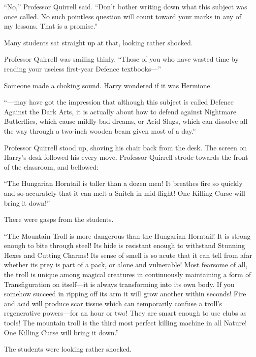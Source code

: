 “No,” Professor Quirrell said. “Don’t bother writing down what this subject was once called. No such pointless question will count toward your marks in any of my lessons. That is a promise.”

Many students sat straight up at that, looking rather shocked.

Professor Quirrell was smiling thinly. “Those of you who have wasted time by reading your useless first-year Defence textbooks—”

Someone made a choking sound. Harry wondered if it was Hermione.

“—may have got the impression that although this subject is called Defence Against the Dark Arts, it is actually about how to defend against Nightmare Butterflies, which cause mildly bad dreams, or Acid Slugs, which can dissolve all the way through a two-inch wooden beam given most of a day.”

Professor Quirrell stood up, shoving his chair back from the desk. The screen on Harry’s desk followed his every move. Professor Quirrell strode towards the front of the classroom, and bellowed:

“The Hungarian Horntail is taller than a dozen men! It breathes fire so quickly and so accurately that it can melt a Snitch in mid-flight! One Killing Curse will bring it down!”

There were gasps from the students.

“The Mountain Troll is more dangerous than the Hungarian Horntail! It is strong enough to bite through steel! Its hide is resistant enough to withstand Stunning Hexes and Cutting Charms! Its sense of smell is so acute that it can tell from afar whether its prey is part of a pack, or alone and vulnerable! Most fearsome of all, the troll is unique among magical creatures in continuously maintaining a form of Transfiguration on itself—it is always transforming into its own body. If you somehow succeed in ripping off its arm it will grow another within seconds! Fire and acid will produce scar tissue which can temporarily confuse a troll’s regenerative powers—for an hour or two! They are smart enough to use clubs as tools! The mountain troll is the third most perfect killing machine in all Nature! One Killing Curse will bring it down.”

The students were looking rather shocked.

